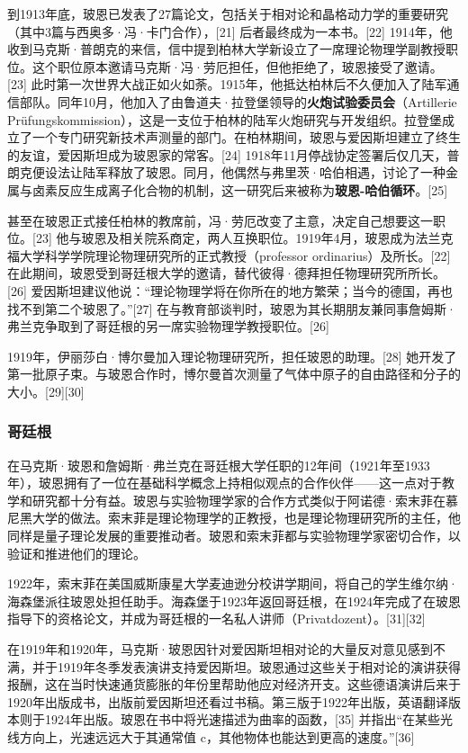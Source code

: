 到1913年底，玻恩已发表了27篇论文，包括关于相对论和晶格动力学的重要研究（其中3篇与西奥多·冯·卡门合作），[21] 后者最终成为一本书。[22] 1914年，他收到马克斯·普朗克的来信，信中提到柏林大学新设立了一席理论物理学副教授职位。这个职位原本邀请马克斯·冯·劳厄担任，但他拒绝了，玻恩接受了邀请。[23] 此时第一次世界大战正如火如荼。1915年，他抵达柏林后不久便加入了陆军通信部队。同年10月，他加入了由鲁道夫·拉登堡领导的\textbf{火炮试验委员会}（Artillerie Prüfungskommission），这是一支位于柏林的陆军火炮研究与开发组织。拉登堡成立了一个专门研究新技术声测量的部门。在柏林期间，玻恩与爱因斯坦建立了终生的友谊，爱因斯坦成为玻恩家的常客。[24] 1918年11月停战协定签署后仅几天，普朗克便设法让陆军释放了玻恩。同月，他偶然与弗里茨·哈伯相遇，讨论了一种金属与卤素反应生成离子化合物的机制，这一研究后来被称为\textbf{玻恩-哈伯循环}。[25]  

甚至在玻恩正式接任柏林的教席前，冯·劳厄改变了主意，决定自己想要这一职位。[23] 他与玻恩及相关院系商定，两人互换职位。1919年4月，玻恩成为法兰克福大学科学学院理论物理研究所的正式教授（professor ordinarius）及所长。[22] 在此期间，玻恩受到哥廷根大学的邀请，替代彼得·德拜担任物理研究所所长。[26] 爱因斯坦建议他说：“理论物理学将在你所在的地方繁荣；当今的德国，再也找不到第二个玻恩了。”[27] 在与教育部谈判时，玻恩为其长期朋友兼同事詹姆斯·弗兰克争取到了哥廷根的另一席实验物理学教授职位。[26]  

1919年，伊丽莎白·博尔曼加入理论物理研究所，担任玻恩的助理。[28] 她开发了第一批原子束。与玻恩合作时，博尔曼首次测量了气体中原子的自由路径和分子的大小。[29][30]
\subsubsection{哥廷根}
在马克斯·玻恩和詹姆斯·弗兰克在哥廷根大学任职的12年间（1921年至1933年），玻恩拥有了一位在基础科学概念上持相似观点的合作伙伴——这一点对于教学和研究都十分有益。玻恩与实验物理学家的合作方式类似于阿诺德·索末菲在慕尼黑大学的做法。索末菲是理论物理学的正教授，也是理论物理研究所的主任，他同样是量子理论发展的重要推动者。玻恩和索末菲都与实验物理学家密切合作，以验证和推进他们的理论。

1922年，索末菲在美国威斯康星大学麦迪逊分校讲学期间，将自己的学生维尔纳·海森堡派往玻恩处担任助手。海森堡于1923年返回哥廷根，在1924年完成了在玻恩指导下的资格论文，并成为哥廷根的一名私人讲师（Privatdozent）。[31][32]

在1919年和1920年，马克斯·玻恩因针对爱因斯坦相对论的大量反对意见感到不满，并于1919年冬季发表演讲支持爱因斯坦。玻恩通过这些关于相对论的演讲获得报酬，这在当时快速通货膨胀的年份里帮助他应对经济开支。这些德语演讲后来于1920年出版成书，出版前爱因斯坦还看过书稿。第三版于1922年出版，英语翻译版本则于1924年出版。玻恩在书中将光速描述为曲率的函数，[35] 并指出“在某些光线方向上，光速远远大于其通常值 c，其他物体也能达到更高的速度。”[36]


